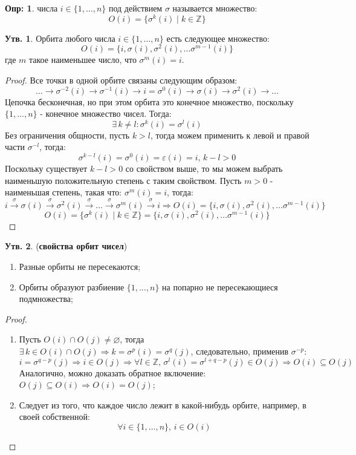 \documentclass[12pt]{article}
\newcommand{\MZ}{\mathbb{Z}}
\newcommand{\VN}{\varnothing}
\newcommand{\VE}{\varepsilon}
\theoremstyle{definition}
\newtheorem{defn}{Опр:}
\newtheorem{prop}{Утв.}
\begin{document}
\begin{defn}
	 числа $i \in \{1,\dotsc, n\}$ под действием $\sigma$ называется множество:
	$$
		O(i) = \{\sigma^{k}(i) \mid k \in \MZ\}
	$$
\end{defn}
\begin{prop}
	Орбита любого числа $i \in \{1,\dotsc, n\}$ есть следующее множество:
	$$
		O(i) = \{i, \sigma(i),\sigma^2(i), \dotsc \sigma^{m-1}(i)\}
	$$
	где $m$ такое наименьшее число, что $\sigma^m(i)= i$.
\end{prop}
\begin{proof}
	Все точки в одной орбите связаны следующим образом:
	$$
		\dotsc \to \sigma^{-2}(i) \to \sigma^{-1}(i) \to i = \sigma^{0}(i) \to \sigma(i) \to \sigma^{2}(i) \to \dotsc
	$$
	Цепочка бесконечная, но при этом орбита это конечное множество, поскольку $\{1,\dotsc,n\}$ - конечное множество чисел. Тогда: 
	$$
		\exists \, k \neq l \colon \sigma^k(i) = \sigma^l(i)
	$$ 
	Без ограничения общности, пусть $k > l$, тогда можем применить к левой и правой части $\sigma^{-l}$, тогда:
	$$
		\sigma^{k - l}(i) = \sigma^{0}(i) = \VE(i) = i, \, k -l > 0
	$$
	Поскольку существует $k -l > 0$ со свойством выше, то мы можем выбрать наименьшую положительную степень с таким свойством. Пусть $m > 0$ - наименьшая степень, такая что: $\sigma^m(i) = i$, тогда: 
	$$
		i \xrightarrow{\sigma} \sigma(i) \xrightarrow{\sigma} \sigma^2(i) \xrightarrow{\sigma} \dotsc \xrightarrow{\sigma} \sigma^m(i) \xrightarrow{\sigma} i \Rightarrow O(i) = \{i, \sigma(i),\sigma^2(i), \dotsc \sigma^{m-1}(i)\}
	$$
	$$
		O(i) = \{\sigma^{k}(i) \mid k \in \MZ\} =  \{i, \sigma(i),\sigma^2(i), \dotsc \sigma^{m-1}(i)\}
	$$
\end{proof}
\begin{prop}(\textbf{свойства орбит чисел})
	\begin{enumerate}[label=(\arabic*)]
		\item Разные орбиты не пересекаются;
		\item Орбиты образуют разбиение $\{1,\dotsc,n\}$ на попарно не пересекающиеся подмножества;
	\end{enumerate}
\end{prop}

\begin{proof}\hfill
	\begin{enumerate}[label=(\arabic*)]
		\item Пусть $O(i) \cap O(j) \neq \VN$, тогда $\exists \, k \in O(i) \cap O(j) \Rightarrow k = \sigma^p(i) = \sigma^q(j)$, следовательно, применив $\sigma^{-p}$:
		$$
			i = \sigma^{q - p}(j) \Rightarrow i \in O(j) \Rightarrow \forall l \in \MZ, \, \sigma^{l}(i) = \sigma^{l + q-p}(j) \in O(j) \Rightarrow O(i)\subseteq O(j)
		$$
		Аналогично, можно доказать обратное включение: $O(j) \subseteq O(i) \Rightarrow O(i) = O(j)$;
		\item Следует из того, что каждое число лежит в какой-нибудь орбите, например, в своей собственной: 	
		$$
			\forall i \in \{1,\dotsc, n\}, \, i \in O(i)
		$$
	\end{enumerate}
\end{proof}
\end{document}
